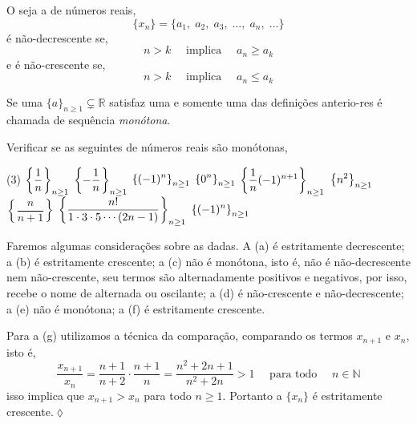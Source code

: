 O seja a \seq  de n\'{u}meros reais,
\begin{equation*}
    \{x_n\}=\{a_1,\;a_2,\;a_3,\;\ldots,\; a_n,\;\ldots  \}
\end{equation*}
\'{e} n\~{a}o-decrescente se,
\begin{equation*}
    n>k\quad \text{ implica }\quad a_n\geq a_k
\end{equation*}
e \'{e} n\~{a}o-crescente se,
\begin{equation*}
    n>k\quad \text{ implica }\quad a_n\leq a_k
\end{equation*}

\begin{note}
Se uma \seq $\{a\}_{n\geq 1}\subsetneq \mathbb{R}$  satisfaz  uma e somente uma das
defini\c{c}\~{o}es anterio-res  \'{e} chamada de sequ\^{e}ncia \textit{mon\'{o}tona}.
\end{note}

\begin{exer}
Verificar se as seguintes \seqs de n\'{u}meros reais s\~{a}o mon\'{o}tonas,
\begin{tasks}[label=\rm{(\alph*)},item-indent=2.8em,label-width=3ex,ref=(\alph*)](3)
\task  \(\displaystyle{\left\{\frac{1}{n}_{}\right\}_{n\geq 1}}\)
\task  \(\displaystyle{\left\{-\frac{1}{n}_{}\right\}_{n\geq 1}}\)
\task  \(\displaystyle{\left\{(-1)^n_{}\right\}_{n\geq 1}}\)
\task  \(\displaystyle{\left\{0^n_{}\right\}_{n\geq 1}}\)
\task  \(\displaystyle{\left\{\frac{1}{n}(-1)^{n+1}_{}\right\}_{n\geq 1}}\)
\task  \(\displaystyle{\left\{n^2_{}\right\}_{n\geq 1}}\)
\task  \(\left\{\dfrac{n}{n+1}\right\}\)
\task  \(\displaystyle{\left\{\frac{n!}{1\cdot 3\cdot 5\cdots (2n-1)}_{}\right\}_{n\geq 1}}\)
\task  \(\displaystyle{\left\{(-1)^n_{}\right\}_{n\geq 1}}\)
\end{tasks}
\end{exer}

\solo Faremos algumas considera\c{c}\~{o}es sobre as \seqs dadas. A \seq (a) \'{e} estritamente 
decrescente; a \seq (b) \'{e} estritamente crescente; a \seq  (c) n\~{a}o \'{e} 
mon\'{o}tona, isto \'{e}, n\~{a}o \'{e} n\~{a}o-decrescente nem n\~{a}o-crescente, seu 
termos s\~{a}o alternadamente positivos e negativos, por isso, recebe o nome de \seq alternada 
ou oscilante; a \seq (d) \'{e} n\~{a}o-crescente e n\~{a}o-decrescente; 
a \seq (e) n\~{a}o \'{e} mon\'{o}tona; a \seq (f) \'{e} estritamente crescente.

Para a \seq (g) utilizamos a t\'{e}cnica da compara\c{c}\~{a}o, comparando os termos $x_{n+1}$ e $x_n$, 
isto \'{e},
\begin{equation*}
\dfrac{x_{n+1}}{x_n}=\dfrac{n+1}{n+2}\cdot\dfrac{n+1}{n}=\dfrac{n^2+2n+1}{n^2+2n}>1\quad 
\text{ para todo }\quad n\in \mathbb{N}
\end{equation*}
isso implica que $x_{n+1}>x_{n}$ para todo $n\geq 1$. Portanto a \seq  $\{x_n\}$ \'{e} estritamente 
crescente.\hfill \(\lozenge\)

